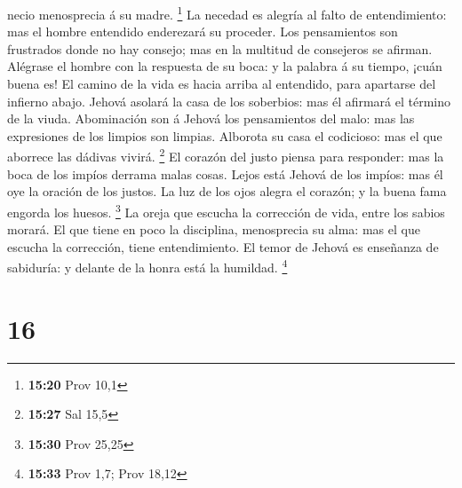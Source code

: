 necio menosprecia á su madre. \footnote{\textbf{15:20} Prov 10,1}
 La necedad es alegría al falto de entendimiento: mas el
hombre entendido enderezará su proceder.  Los pensamientos
son frustrados donde no hay consejo; mas en la multitud de consejeros se
afirman.  Alégrase el hombre con la respuesta de su boca: y
la palabra á su tiempo, ¡cuán buena es!  El camino de la
vida es hacia arriba al entendido, para apartarse del infierno abajo.
 Jehová asolará la casa de los soberbios: mas él afirmará
el término de la viuda.  Abominación son á Jehová los
pensamientos del malo: mas las expresiones de los limpios son limpias.
 Alborota su casa el codicioso: mas el que aborrece las
dádivas vivirá. \footnote{\textbf{15:27} Sal 15,5}  El
corazón del justo piensa para responder: mas la boca de los impíos
derrama malas cosas.  Lejos está Jehová de los impíos: mas
él oye la oración de los justos.  La luz de los ojos alegra
el corazón; y la buena fama engorda los huesos. \footnote{\textbf{15:30}
  Prov 25,25}  La oreja que escucha la corrección de vida,
entre los sabios morará.  El que tiene en poco la
disciplina, menosprecia su alma: mas el que escucha la corrección, tiene
entendimiento.  El temor de Jehová es enseñanza de
sabiduría: y delante de la honra está la humildad. \footnote{\textbf{15:33}
  Prov 1,7; Prov 18,12}

\hypertarget{section-15}{%
\section{16}\label{section-15}}

